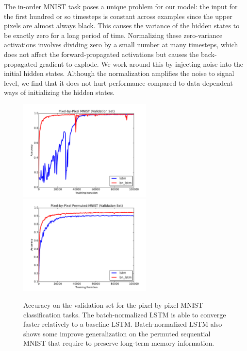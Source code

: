 \documentclass{article} %
\begin{document}
The in-order MNIST task poses a unique problem for our model:
the input for the first hundred or so timesteps is constant across examples since the upper pixels are almost always black.
This causes the variance of the hidden states to be exactly zero for a long period of time.
Normalizing these zero-variance activations involves dividing zero by a small number at many timesteps, which does not affect the forward-propagated activations but causes the back-propagated gradient to explode.
We work around this by injecting noise into the initial hidden states.
Although the normalization amplifies the noise to signal level, we find that it does not hurt performance compared to data-dependent ways of initializing the hidden states.

\begin{figure}[!t]
\center
\includegraphics[width=6.7cm]{figures/unpermuted_valid.pdf}
\includegraphics[width=6.7cm]{figures/permuted_valid.pdf}
\caption{Accuracy on the validation set for the pixel by pixel MNIST classification tasks. The batch-normalized LSTM is able to converge faster relatively to a baseline LSTM.
  Batch-normalized  LSTM also shows some improve generalization on the permuted sequential MNIST that require to preserve long-term memory information.}
\label{fig:seqmnist_valid}
\end{figure}
\end{document}
